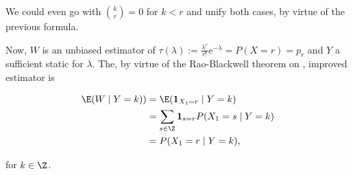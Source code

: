 \begin{solution}
\begin{enumerate}[label = (\alph*)]
\begin{enumerate}[label = \arabic*.]
    \end{enumerate}

    We could even go with $\binom{k}{r} = 0$ for $k < r$ and unify both cases, by virtue of the previous formula.

    Now, $W$ is an unbiased estimator of $\tau(\lambda) := \frac{\lambda^r}{r!} \mathrm e^{-\lambda} = P(X = r) = p_r$ and $Y$ a sufficient static for $\lambda$.
    The, by virtue of the Rao-Blackwell theorem on \cite[lecture 8, slide 37]{EStat}, improved estimator is

    \begin{align*}
        \E(W \mid Y = k))
        & =
        \E(\mathbf 1_{X_1 = r} \mid Y = k) \\
        & =
        \sum_{s \in \Z}
            \mathbf 1_{s = r}
            P(X_1 = s \mid Y = k) \\
        & =
        P(X_1 = r \mid Y = k),
    \end{align*}

    for $k \in \Z$.

\end{enumerate}

\end{solution}

